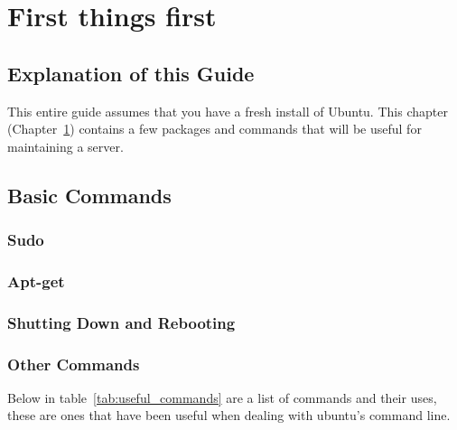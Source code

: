 \chapter{First things first}
\label{chp:first}

\section{Explanation of this Guide}

This entire guide assumes that you have a fresh install of Ubuntu. This chapter (Chapter~\ref{chp:first}) contains a few packages and commands that will be useful for maintaining a server.~

\section{Basic Commands}

\subsection{Sudo}
\label{ssec:sudo}


\subsection{Apt-get} 



\subsection{Shutting Down and Rebooting}



\subsection{Other Commands}

Below in table~\ref{tab:useful_commands} are a list of commands and their uses, these are ones that have been useful when dealing with ubuntu's command line.

